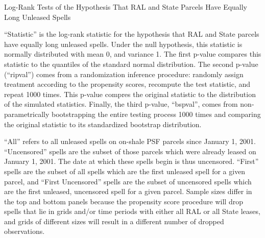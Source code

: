 \begin{appendices}
\begin{table}[htbp]
	\begin{center}
		\begin{threeparttable}
			\caption{Log-Rank Tests of the Hypothesis That RAL and State Parcels Have Equally Long Unleased Spells}\label{tab:logrank}
			\small
			
			\footnotesize
			\begin{tablenotes}
				\item ``Statistic'' is the log-rank statistic for the hypothesis that RAL and State parcels have equally long unleased spells.  Under the null hypothesis, this statistic is normally distributed with mean 0, and variance 1.  The first p-value compares this statistic to the quantiles of the standard normal distribution.  The second p-value (``ripval'') comes from a randomization inference procedure: randomly assign treatment according to the propensity scores, recompute the test statistic, and repeat 1000 times.  This p-value compres the original statistic to the distribution of the simulated statistics.  Finally, the third p-value, ``bspval'', comes from non-parametrically bootstrapping the entire testing process 1000 times and comparing the original statistic to its standardized bootstrap distribution.
				\item ``All'' refers to all unleased spells on on-shale PSF parcels since January 1, 2001.  ``Uncensored'' spells are the subset of those parcels which were already leased on January 1, 2001.  The date at which these spells begin is thus uncensored.  ``First'' spells are the subset of all spells which are the first unleased spell for a given parcel, and ``First Uncensored'' spells are the subset of uncensored spells which are the first unleased, uncensored spell for a given parcel.  Sample sizes differ in the top and bottom panels because the propensity score procedure will drop spells that lie in grids and/or time periods with either all RAL or all State leases, and grids of different sizes will result in a different number of dropped observations.
			\end{tablenotes}
		\end{threeparttable}
	\end{center}
\end{table}
	
\addtolength{\tabcolsep}{-6pt}


\end{appendices}
